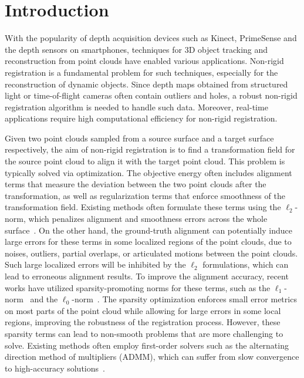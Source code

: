 \section{Introduction}

With the popularity of depth acquisition devices such as Kinect, PrimeSense and the depth sensors on smartphones, techniques for 3D object tracking and reconstruction from point clouds have enabled various applications. Non-rigid registration is a fundamental problem for such techniques, especially for the reconstruction of dynamic objects.
Since depth maps obtained from structured light or time-of-flight cameras often contain outliers and holes, a robust non-rigid registration algorithm is needed to handle such data. Moreover, real-time applications require high computational efficiency for non-rigid registration.

Given two point clouds sampled from a source surface and a target surface respectively,
the aim of non-rigid registration is to find a transformation field for the source point cloud to align it with the target point cloud.
This problem is typically solved via optimization.
The objective energy often includes alignment terms that measure the deviation between the two point clouds after the transformation, as well as regularization terms that enforce smoothness of the transformation field.
Existing methods often formulate these terms using the $\ell_2$-norm, which penalizes alignment and smoothness errors across the whole surface~\cite{amberg2007optimal,li2008global,li2009robust}. On the other hand, the ground-truth alignment can potentially induce large errors for these terms in some localized regions of the point clouds, due to noises, outliers, partial overlaps, or articulated motions between the point clouds. Such large localized errors will be inhibited by the $\ell_2$ formulations, which can lead to erroneous alignment results.
To improve the alignment accuracy, recent works have utilized sparsity-promoting norms for these terms, such as the $\ell_1$-norm~\cite{yang2015sparse,li2018robust,jiang2019huber} and the $\ell_0$-norm~\cite{guo2015robust}.
The sparsity optimization enforces small error metrics on most parts of the point cloud while allowing for large errors in some local regions, improving the robustness of the registration process.
However, these sparsity terms can lead to non-smooth problems that are more challenging to solve.
Existing methods often employ first-order solvers such as the alternating direction method of multipliers (ADMM), which can suffer from slow convergence to high-accuracy solutions~\cite{boyd2011distributed}.


